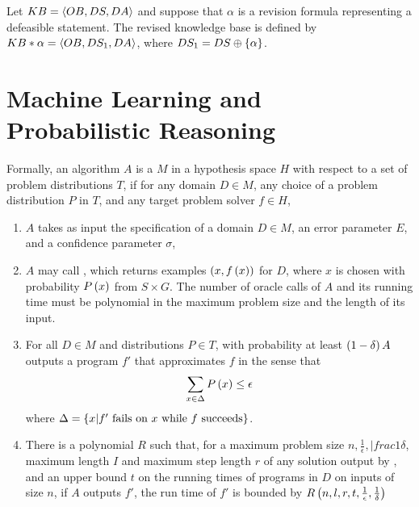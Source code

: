 \begin{defi}
Let $KB=\left\langle OB,DS,DA\right\rangle$ and suppose that $\alpha$ is a revision formula representing a defeasible statement. The revised knowledge base is defined by $KB\ast\alpha=\left\langle OB,DS_1,DA\right\rangle$, where $DS_1=DS\oplus\left\{ \alpha\right\}$.
\cite{conf/fedcsis/KorpusikLM12}
\end{defi}

\section{Machine Learning and Probabilistic Reasoning}

\begin{defi}%
Formally, an algorithm $A$ is a  $M$ in a hypothesis space $H$ with respect to a set of problem distributions $T$, if for any domain $D\in M$, any choice of a problem distribution $P$ in $T$, and any target problem solver $f\in H$,
\begin{enumerate}
\item $A$ takes as input the specification of a domain $D\in M$, an error parameter $E$, and a confidence parameter $\sigma$,
\item $A$ may call , which returns examples $\left( x,f\left(x\right)\right)$ for $D$, where $x$ is chosen with probability $P\left(x\right)$ from $S\times G$. The number of oracle calls of $A$ and its running time must be polynomial in the maximum problem size and the length of its input.
\item For all $D\in M$ and distributions $P\in T$, with probability at least $\left( 1-\delta\right)A$ outputs a program $f'$ that approximates $f$ in the sense that
\begin{equation}
\displaystyle\sum_{x\in\Delta}{P\left(x\right)}\leq\epsilon
\end{equation}
where $\Delta=\left\{ x | f'\mbox{ fails on }x\mbox{ while }f\mbox{ succeeds}\right\}$.
\item There is a polynomial $R$ such that, for a maximum problem size $n,\frac{1}{\epsilon},|frac{1}{\delta}$, maximum length $I$ and maximum step length $r$ of any solution output by , and an upper bound $t$ on the running times of programs in $D$ on inputs of size $n$, if $A$ outputs $f'$, the run time of $f'$ is bounded by $R\left(n,l,r,t,\frac{1}{\epsilon},\frac{1}{\delta}\right)$
\end{enumerate}
\cite{conf/ijcai/Tadepalli91}
\end{defi}

